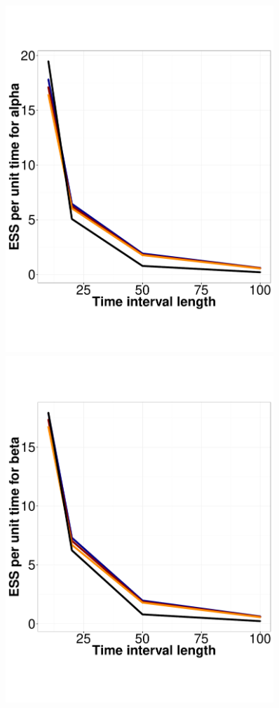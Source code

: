   \begin{figure}%
  \centering
  \begin{minipage}[hp]{0.45\linewidth}
  \centering
    \includegraphics [width=0.90\textwidth, angle=0]{figs/ESS_vs_t_alpha.pdf}
      \end{minipage}
  \begin{minipage}[hp]{0.45\linewidth}
  \centering
    \includegraphics [width=0.90\textwidth, angle=0]{figs/ESS_vs_t_beta.pdf}

\end{minipage}
\end{figure}
